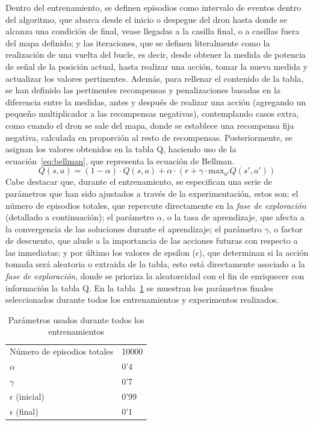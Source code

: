 Dentro del entrenamiento, se definen episodios como intervalo de eventos dentro del algoritmo, que abarca desde el inicio o despegue del dron hasta donde se alcanza una condición de final, vease llegadas a la casilla final, o a casillas fuera del mapa definido; y las iteraciones, que se definen literalmente como la realización de una vuelta del bucle, es decir, desde obtener la medida de potencia de señal de la posición actual, hasta realizar una acción, tomar la nueva medida y actualizar los valores pertinentes. Además, para rellenar el contenido de la tabla, se han definido las pertinentes recompensas y penalizaciones basadas en la diferencia entre la medidas, antes y después de realizar una acción (agregando un pequeño multiplicador a las recompensas negativas), contemplando casos extra, como cuando el dron se sale del mapa, donde se establece una recompensa fija negativa, calculada en proporción al resto de recompensas. Posteriormente, se asignan los valores obtenidos en la tabla Q, haciendo uso de la ecuación~\ref{eq:bellman}, que representa la ecuación de Bellman.
\begin{equation}
    Q(s, a) = (1 - \alpha) \cdot Q(s, a) + \alpha \cdot \left(r + \gamma \cdot \mathrm{max}_{a'} Q(s', a')\right)
    \label{eq:bellman}
\end{equation}
Cabe destacar que, durante el entrenamiento, se especifican una serie de parámetros que han sido ajustados a través de la experimentación, estos son: el número de episodios totales, que repercute directamente en la \emph{fase de exploración} (detallado a continuación); el parámetro $\alpha$, o la tasa de aprendizaje, que afecta a la convergencia de las soluciones durante el aprendizaje; el parámetro $\gamma$, o factor de descuento, que alude a la importancia de las acciones futuras con respecto a las inmediatas; y por último los valores de epsilon ($\epsilon$), que determinan si la acción tomada será aleatoria o extraida de la tabla, esto está directamente asociado a la \emph{fase de exploración}, donde se prioriza la aleatoreidad con el fin de enriquecer con información la tabla Q. En la tabla~\ref{table:params} se muestran los parámetros finales seleccionados durante todos los entrenamientos y experimentos realizados.\\

\begin{table} [t]
    \centering
    \begin{tabular}{ll}
    Número de episodios totales & 10000 \\
    $\alpha$                       & 0'4   \\
    $\gamma$                       & 0'7   \\
    $\epsilon$ (inicial)           & 0'99  \\
    $\epsilon$ (final)             & 0'1   \\
    \end{tabular}
    \caption[Parámetros usados durante todos los entrenamientos]{Parámetros usados durante todos los entrenamientos}
    \label{table:params}
\end{table}

